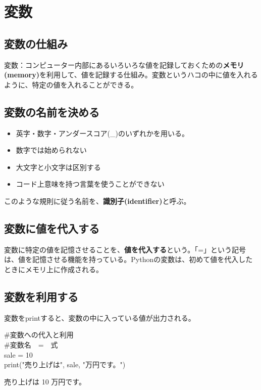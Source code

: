 \documentclass[11pt,a4paper]{jreport}
\begin{document}
\section{変数}
\subsection{変数の仕組み}
変数：コンピューター内部にあるいろいろな値を記録しておくための{\bf メモリ(memory)}を利用して、値を記録する仕組み。変数というハコの中に値を入れるように、特定の値を入れることができる。

\subsection{変数の名前を決める}
\begin{itemize}

 \item 英字・数字・アンダースコア(\_)のいずれかを用いる。
 \item 数字では始められない
 \item 大文字と小文字は区別する
 \item コード上意味を持つ言葉を使うことができない

\end{itemize}

このような規則に従う名前を、{\bf 識別子(identifier)}と呼ぶ。

\subsection{変数に値を代入する}
変数に特定の値を記憶させることを、{\bf 値を代入する}という。「=」という記号は、値を記憶させる機能を持っている。Pythonの変数は、初めて値を代入したときにメモリ上に作成される。

\subsection{変数を利用する}
変数をprintすると、変数の中に入っている値が出力される。
\begin{shadebox}
 \#変数への代入と利用\\
 \#変数名　=　式\\
 sale = 10\\
 print("売り上げは", sale, "万円です。")
\end{shadebox}
\vspace{0.2in}
\begin{screen}
 売り上げは 10 万円です。
\end{screen}
\vspace{0.2in}
\end{document}

